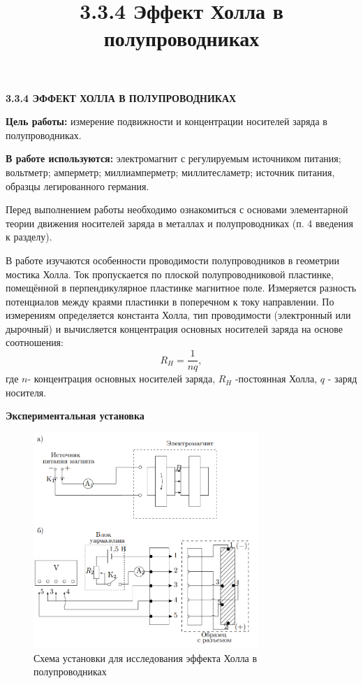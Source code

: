 \documentclass[a4paper,12pt]{article} %
\title{3.3.4 Эффект Холла в полупроводниках}
\date{}
\begin{document}
\begin{center}
\textsf{\textbf{3.3.4 ЭФФЕКТ ХОЛЛА В ПОЛУПРОВОДНИКАХ}}
\end{center}

\textbf{Цель работы:} измерение подвижности и концентрации носителей заряда
в полупроводниках.

\textbf{В работе используются:} электромагнит с регулируемым источником питания; вольтметр; амперметр; миллиамперметр; миллитесламетр; источник питания, образцы легированного германия.

Перед выполнением работы необходимо ознакомиться с основами элементарной теории движения носителей заряда в металлах и полупроводниках (п. 4 введения к разделу).

В работе изучаются особенности проводимости полупроводников в
геометрии мостика Холла. Ток пропускается по плоской полупроводниковой пластинке, помещённой в перпендикулярное пластинке магнитное
поле. Измеряется разность потенциалов между краями пластинки в поперечном к току направлении. По измерениям определяется константа
Холла, тип проводимости (электронный или дырочный) и вычисляется концентрация основных носителей заряда на основе соотношения:
\begin{equation}
R_H = \frac{1}{nq},
\end{equation}
где $n$- концентрация основных носителей заряда, $R_H$ -постоянная Холла, $q$ - заряд носителя.

\textbf{Экспериментальная установка}
\begin{figure}[h!]
\begin{center}
\includegraphics[width=0.76\textwidth]{Установка}
\caption{Схема установки для исследования эффекта Холла в полупроводниках} \label{установка}
\end{center}
\end{figure} 
\end{document}
